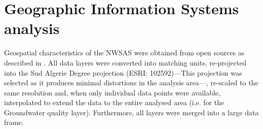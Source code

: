 \documentclass[12pt]{iopart}
\begin{document}
\section{Geographic Information Systems analysis}
Geospatial characteristics of the NWSAS were obtained from open sources as described in  . All data layers were converted into matching units, re-projected into the Sud Algerie Degree projection (ESRI: 102592)---This projection was selected as it produces minimal distortions in the analysis area---, re-scaled to the same resolution and, when only individual data points were available, interpolated to extend the data to the entire analysed area (i.e. for the Groundwater quality layer). Furthermore, all layers were merged into a large data frame.
\end{document}
